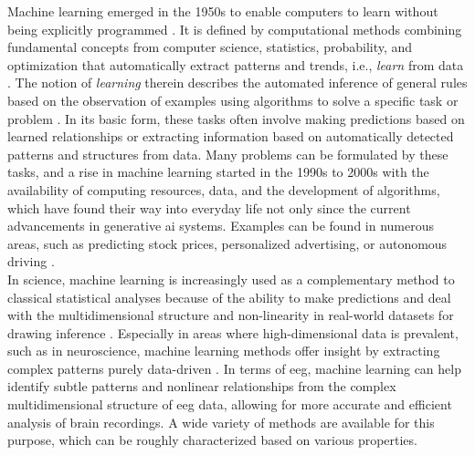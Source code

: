 Machine learning emerged in the 1950s to enable computers to learn without being explicitly programmed \cite{Samual1959}. It is defined by computational methods combining fundamental concepts from computer science, statistics, probability, and optimization that automatically extract patterns and trends, i.e., \textit{learn} from data \cite{Hastie2009}. The notion of \textit{learning} therein describes the automated inference of general rules based on the observation of examples using algorithms to solve a specific task or problem \cite{Von_luxburg2011}. In its basic form, these tasks often involve making predictions based on learned relationships or extracting information based on automatically detected patterns and structures from data. Many problems can be formulated by these tasks, and a rise in machine learning started in the 1990s to 2000s with the availability of computing resources, data, and the development of algorithms, which have found their way into everyday life not only since the current advancements in generative \gls{ai} systems. Examples can be found in numerous areas, such as predicting stock prices, personalized advertising, or autonomous driving \cite{Rudin2014}.\\
In science, machine learning is increasingly used as a complementary method to classical statistical analyses because of the ability to make predictions and deal with the multidimensional structure and non-linearity in real-world datasets for drawing inference \cite{Bzdok2018}. Especially in areas where high-dimensional data is prevalent, such as in neuroscience, machine learning methods offer insight by extracting complex patterns purely data-driven \cite{Brunton2019}. In terms of \gls{eeg}, machine learning can help identify subtle patterns and nonlinear relationships from the complex multidimensional structure of \gls{eeg} data, allowing for more accurate and efficient analysis of brain recordings. A wide variety of methods are available for this purpose, which can be roughly characterized based on various properties. 

